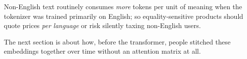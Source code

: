 Non-English text routinely consumes \emph{more} tokens per unit of meaning when
the tokenizer was trained primarily on English; so equality-sensitive products
should quote prices \emph{per language} or risk silently taxing non-English
users.

The next section is about how, before the transformer, people stitched these
embeddings together over time without an attention matrix at all.
